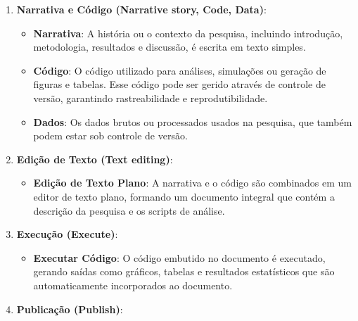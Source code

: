 \documentclass[
  a4paper,
]{article}
\providecommand{\tightlist}{%
  \setlength{\itemsep}{0pt}\setlength{\parskip}{0pt}}\usepackage{longtable,booktabs,array}
\begin{document}
\begin{tcolorbox}[enhanced jigsaw, toptitle=1mm, opacitybacktitle=0.6, colframe=quarto-callout-note-color-frame, rightrule=.15mm, coltitle=black, breakable, titlerule=0mm, colbacktitle=quarto-callout-note-color!10!white, colback=white, title=\textcolor{quarto-callout-note-color}{\faInfo}\hspace{0.5em}{O que o ChatGPT 4o nos diz sobre a Figure~\ref{fig-all-workflow}?}, left=2mm, leftrule=.75mm, opacityback=0, toprule=.15mm, bottomrule=.15mm, bottomtitle=1mm, arc=.35mm]

\begin{enumerate}
\def\labelenumi{\arabic{enumi}.}
\tightlist
\item
  \textbf{Narrativa e Código (Narrative story, Code, Data)}:

  \begin{itemize}
  \tightlist
  \item
    \textbf{Narrativa}: A história ou o contexto da pesquisa, incluindo
    introdução, metodologia, resultados e discussão, é escrita em texto
    simples.
  \item
    \textbf{Código}: O código utilizado para análises, simulações ou
    geração de figuras e tabelas. Esse código pode ser gerido através de
    controle de versão, garantindo rastreabilidade e reprodutibilidade.
  \item
    \textbf{Dados}: Os dados brutos ou processados usados na pesquisa,
    que também podem estar sob controle de versão.
  \end{itemize}
\item
  \textbf{Edição de Texto (Text editing)}:

  \begin{itemize}
  \tightlist
  \item
    \textbf{Edição de Texto Plano}: A narrativa e o código são
    combinados em um editor de texto plano, formando um documento
    integral que contém a descrição da pesquisa e os scripts de análise.
  \end{itemize}
\item
  \textbf{Execução (Execute)}:

  \begin{itemize}
  \tightlist
  \item
    \textbf{Executar Código}: O código embutido no documento é
    executado, gerando saídas como gráficos, tabelas e resultados
    estatísticos que são automaticamente incorporados ao documento.
  \end{itemize}
\item
  \textbf{Publicação (Publish)}:


\end{enumerate}
\end{tcolorbox}
\end{document}
